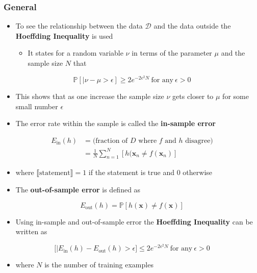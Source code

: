 \documentclass[11pt]{article}
\begin{document}
\subsubsection{General}
\label{sec:org198aec4}
\begin{itemize}
\item To see the relationship between the data \(\mathcal D\) and the data outside the \textbf{Hoeffding Inequality} is used
\begin{itemize}
\item It states for a random variable \(\nu\) in terms of the parameter \(\mu\) and the sample size \(N\) that
\end{itemize}
\end{itemize}
\begin{equation}
      \mathbb P[|\nu - \mu > \epsilon] \geq 2e^{-2\epsilon^2N} \ \text{for any} \ \epsilon > 0
\end{equation}
\begin{itemize}
\item This shows that as one increase the sample size \(\nu\) gets closer to \(\mu\) for some small number \(\epsilon\)

\item The error rate within the sample is called the \textbf{in-sample error}
\end{itemize}
\begin{equation}
  \begin{split} 
    E_\text{in}(h) &= \text{(fraction of $D$ where $f$ and $h$ disagree)} \\
      &= \frac1N \sum_{n=1}^N [ h(\pmb x_n \ne f(\pmb x_n) ]
  \end{split}
\end{equation}
\begin{itemize}
\item where \(\llbracket \text{statement} \rrbracket = 1\) if the statement is true and \(0\) otherwise

\item The \textbf{out-of-sample error} is defined as
\end{itemize}
\begin{equation}
  E_\text{out}(h)=\mathbb P [h(\pmb x) \ne f(\pmb x)]
\end{equation}

\begin{itemize}
\item Using in-sample and out-of-sample error the \textbf{Hoeffding Inequality} can be written as
\end{itemize}
\begin{equation}
        \mathbb [|E_\text{in}(h)-E_\text{out}(h) > \epsilon] \leq 2e^{-2\epsilon^2N} \ \text{for any} \ \epsilon > 0
\end{equation}
\begin{itemize}
\item where \(N\) is the number of training examples
\end{itemize}
\end{document}
